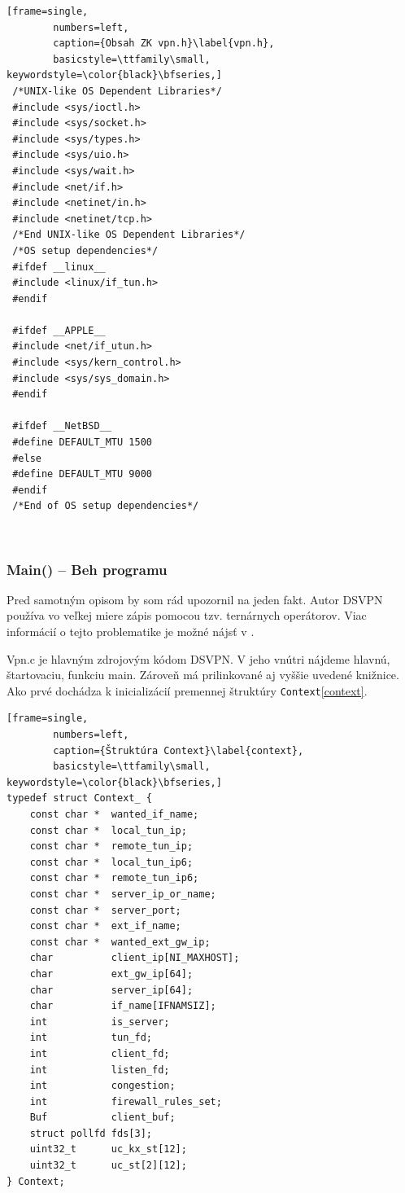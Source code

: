  \begin{minipage}{\linewidth} 	
 	\begin{lstlisting}[frame=single,
 		numbers=left,
 		caption={Obsah ZK vpn.h}\label{vpn.h},
 		basicstyle=\ttfamily\small, keywordstyle=\color{black}\bfseries,]
 /*UNIX-like OS Dependent Libraries*/
 #include <sys/ioctl.h>
 #include <sys/socket.h>
 #include <sys/types.h>
 #include <sys/uio.h>
 #include <sys/wait.h>
 #include <net/if.h>
 #include <netinet/in.h>
 #include <netinet/tcp.h>
 /*End UNIX-like OS Dependent Libraries*/
 /*OS setup dependencies*/
 #ifdef __linux__
 #include <linux/if_tun.h>
 #endif
 
 #ifdef __APPLE__
 #include <net/if_utun.h>
 #include <sys/kern_control.h>
 #include <sys/sys_domain.h>
 #endif
 
 #ifdef __NetBSD__
 #define DEFAULT_MTU 1500
 #else
 #define DEFAULT_MTU 9000
 #endif
 /*End of OS setup dependencies*/ 
 	\end{lstlisting}
\end{minipage}\\

\subsubsection{Main() -- Beh programu}
Pred samotným opisom by som rád upozornil na jeden fakt. Autor DSVPN používa vo veľkej miere zápis pomocou tzv. ternárnych operátorov. Viac informácií o tejto problematike je možné nájsť v \cite{ternary}.

Vpn.c je hlavným zdrojovým kódom DSVPN. V jeho vnútri nájdeme hlavnú, štartovaciu, funkciu main. Zároveň má prilinkované aj vyššie uvedené knižnice. Ako prvé dochádza k inicializácií premennej štruktúry \lstinline|Context|\ref{context}.

\begin{minipage}{\linewidth} 	
	\begin{lstlisting}[frame=single,
		numbers=left,
		caption={Štruktúra Context}\label{context},
		basicstyle=\ttfamily\small, keywordstyle=\color{black}\bfseries,]
typedef struct Context_ {
	const char *  wanted_if_name;
	const char *  local_tun_ip;
	const char *  remote_tun_ip;
	const char *  local_tun_ip6;
	const char *  remote_tun_ip6;
	const char *  server_ip_or_name;
	const char *  server_port;
	const char *  ext_if_name;
	const char *  wanted_ext_gw_ip;
	char          client_ip[NI_MAXHOST];
	char          ext_gw_ip[64];
	char          server_ip[64];
	char          if_name[IFNAMSIZ];
	int           is_server;
	int           tun_fd;
	int           client_fd;
	int           listen_fd;
	int           congestion;
	int           firewall_rules_set;
	Buf           client_buf;
	struct pollfd fds[3];
	uint32_t      uc_kx_st[12];
	uint32_t      uc_st[2][12];
} Context;   
 	\end{lstlisting}
\end{minipage}\\ 

